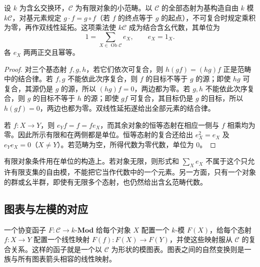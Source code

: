 \begin{proposition}\label{b4:prop:category-algebra-unit}
	设 \(k\) 为含幺交换环，\(\mathcal C\) 为有限对象的小范畴。以 \(\mathcal C\) 的全部态射为基构造自由 \(k\) 模 \(k\mathcal C\)，对基元素规定 \(g\cdot f=g\circ f\)（若 \(f\) 的终点等于 \(g\) 的起点），不可复合时规定乘积为零，再作双线性延拓。这项乘法使 \(k\mathcal C\) 成为结合含幺代数，其单位为
	\[
		1=\sum_{X\in\operatorname{Ob}\mathcal C}e_X, \qquad e_X=1_X.
	\]
	各 \(e_X\) 两两正交且幂等。
\end{proposition}
\begin{proof}
	对三个基态射 \(f,g,h\)，若它们依次可复合，则 \(h(gf)=(hg)f\) 正是范畴中的结合律。若 \(f,g\) 不能依此次序复合，则 \(f\) 的目标不等于 \(g\) 的源；即使 \(hg\) 可复合，其源仍是 \(g\) 的源，所以 \((hg)f=0\)，两边都为零。若 \(g,h\) 不能依此次序复合，则 \(g\) 的目标不等于 \(h\) 的源；即使 \(gf\) 可复合，其目标仍是 \(g\) 的目标，所以 \(h(gf)=0\)，两边也都为零。双线性延拓遂给出全部元素的结合律。

	若 \(f:X\to Y\)，则 \(e_Yf=f=fe_X\)，而其余对象的恒等态射在相应一侧与 \(f\) 相乘均为零。因此所示有限和在两侧都是单位。恒等态射的复合还给出 \(e_X^2=e_X\) 及 \(e_Ye_X=0\)（\(X\ne Y\)）。若范畴为空，所得代数为零代数，单位为 \(0\)。
\end{proof}

有限对象条件用在单位的构造上。若对象无限，则形式和 \(\sum_Xe_X\) 不属于这个只允许有限支集的自由模，不能把它当作代数中的一个元素。另一方面，只有一个对象的群或幺半群，即使有无限多个态射，也仍然给出含幺范畴代数。

\subsection{图表与左模的对应}
\label{b4:subsec:0105:02}

一个协变函子 \(F:\mathcal C\to k\text{-}\mathbf{Mod}\) 给每个对象 \(X\) 配置一个 \(k\)-模 \(F(X)\)，给每个态射 \(f:X\to Y\) 配置一个线性映射 \(F(f):F(X)\to F(Y)\)，并使这些映射服从 \(\mathcal C\) 的复合关系。这样的函子就是一个以 \(\mathcal C\) 为形状的模图表。图表之间的自然变换则是一族与所有图表箭头相容的线性映射。

